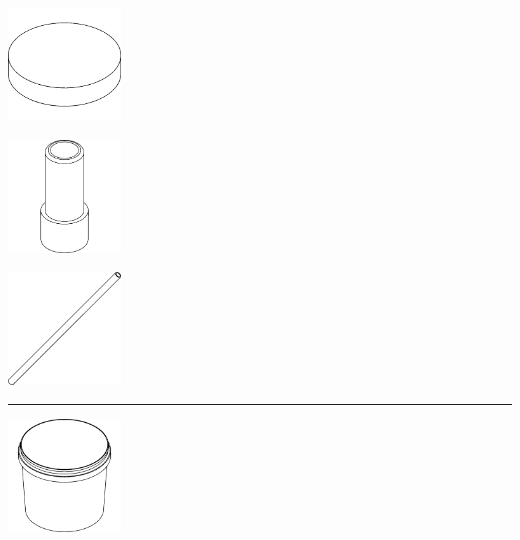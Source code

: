 \begin{center}
    \begin{minipage}{0.3\textwidth}
        \centering
        \includegraphics[height=3cm]{images/wireframes/chimney_lid.png}
    \end{minipage}
    \hfill
    \begin{minipage}{0.3\textwidth}
        \centering
        \includegraphics[height=3cm]{images/wireframes/adapter_13mm.png}
    \end{minipage}
    \hfill
    \begin{minipage}{0.3\textwidth}
        \centering
        \includegraphics[height=3cm]{images/wireframes/hose_13mm.png}
    \end{minipage}

    \vspace{8pt}
    \rule{\textwidth}{0.5pt}
    \vspace{2pt}

    \begin{minipage}{0.3\textwidth}
        \centering
        \includegraphics[height=3cm]{images/wireframes/bucket_5l.png}
    \end{minipage}
\end{center}

